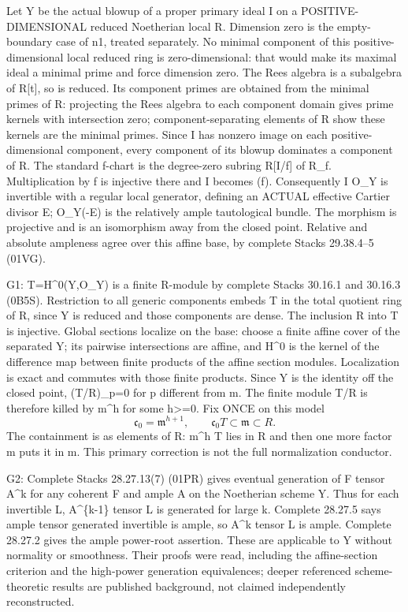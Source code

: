 \documentclass[11pt]{article}
\begin{document}
Let Y be the actual blowup of a proper primary ideal I on a POSITIVE-DIMENSIONAL reduced Noetherian local R. Dimension zero is the empty-boundary case of n1, treated separately. No minimal component of this positive-dimensional local reduced ring is zero-dimensional: that would make its maximal ideal a minimal prime and force dimension zero. The Rees algebra is a subalgebra of R[t], so is reduced. Its component primes are obtained from the minimal primes of R: projecting the Rees algebra to each component domain gives prime kernels with intersection zero; component-separating elements of R show these kernels are the minimal primes. Since I has nonzero image on each positive-dimensional component, every component of its blowup dominates a component of R. The standard f-chart is the degree-zero subring R[I/f] of R\_f. Multiplication by f is injective there and I becomes (f). Consequently I O\_Y is invertible with a regular local generator, defining an ACTUAL effective Cartier divisor E; O\_Y(-E) is the relatively ample tautological bundle. The morphism is projective and is an isomorphism away from the closed point. Relative and absolute ampleness agree over this affine base, by complete Stacks 29.38.4--5 (01VG).

G1: T=H\textasciicircum{}0(Y,O\_Y) is a finite R-module by complete Stacks 30.16.1 and 30.16.3 (0B5S). Restriction to all generic components embeds T in the total quotient ring of R, since Y is reduced and those components are dense. The inclusion R into T is injective. Global sections localize on the base: choose a finite affine cover of the separated Y; its pairwise intersections are affine, and H\textasciicircum{}0 is the kernel of the difference map between finite products of the affine section modules. Localization is exact and commutes with those finite products. Since Y is the identity off the closed point, (T/R)\_p=0 for p different from m. The finite module T/R is therefore killed by m\textasciicircum{}h for some h>=0. Fix ONCE on this model
\[
\mathfrak c_0=\mathfrak m^{h+1},\qquad \mathfrak c_0 T\subset\mathfrak m\subset R.
\]
The containment is as elements of R: m\textasciicircum{}h T lies in R and then one more factor m puts it in m. This primary correction is not the full normalization conductor.

G2: Complete Stacks 28.27.13(7) (01PR) gives eventual generation of F tensor A\textasciicircum{}k for any coherent F and ample A on the Noetherian scheme Y. Thus for each invertible L, A\textasciicircum{}\{k-1\} tensor L is generated for large k. Complete 28.27.5 says ample tensor generated invertible is ample, so A\textasciicircum{}k tensor L is ample. Complete 28.27.2 gives the ample power-root assertion. These are applicable to Y without normality or smoothness. Their proofs were read, including the affine-section criterion and the high-power generation equivalences; deeper referenced scheme-theoretic results are published background, not claimed independently reconstructed.
\end{document}
